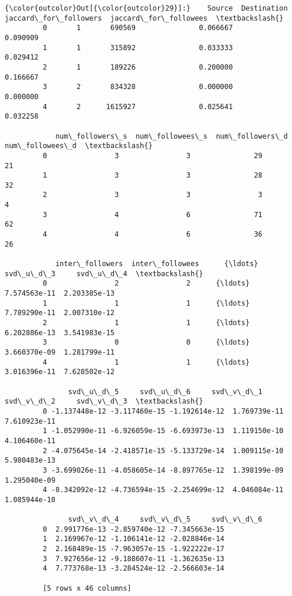 \documentclass[11pt]{article}
\begin{document}
\begin{Verbatim}[commandchars=\\\{\}]
{\color{outcolor}Out[{\color{outcolor}29}]:}    Source  Destination  jaccard\_for\_followers  jaccard\_for\_followees  \textbackslash{}
         0       1       690569               0.066667               0.090909   
         1       1       315892               0.033333               0.029412   
         2       1       189226               0.200000               0.166667   
         3       2       834328               0.000000               0.000000   
         4       2      1615927               0.025641               0.032258   
         
            num\_followers\_s  num\_followees\_s  num\_followers\_d  num\_followees\_d  \textbackslash{}
         0                3                3               29               21   
         1                3                3               28               32   
         2                3                3                3                4   
         3                4                6               71               62   
         4                4                6               36               26   
         
            inter\_followers  inter\_followees      {\ldots}          svd\_u\_d\_3     svd\_u\_d\_4  \textbackslash{}
         0                2                2      {\ldots}       7.574563e-11  2.203385e-13   
         1                1                1      {\ldots}       7.789290e-11  2.007310e-12   
         2                1                1      {\ldots}       6.202886e-13  3.541983e-15   
         3                0                0      {\ldots}       3.660370e-09  1.281799e-11   
         4                1                1      {\ldots}       3.016396e-11  7.628502e-12   
         
               svd\_u\_d\_5     svd\_u\_d\_6     svd\_v\_d\_1     svd\_v\_d\_2     svd\_v\_d\_3  \textbackslash{}
         0 -1.137448e-12 -3.117460e-15 -1.192614e-12  1.769739e-11  7.610923e-11   
         1 -1.052990e-11 -6.926059e-15 -6.693973e-13  1.119150e-10  4.106460e-11   
         2 -4.075645e-14 -2.418571e-15 -5.133729e-14  1.009115e-10  5.980483e-13   
         3 -3.699026e-11 -4.058605e-14 -8.897765e-12  1.398199e-09  1.295040e-09   
         4 -8.342092e-12 -4.736594e-15 -2.254699e-12  4.046084e-11  1.085944e-10   
         
               svd\_v\_d\_4     svd\_v\_d\_5     svd\_v\_d\_6  
         0  2.991776e-13 -2.859740e-12 -7.345663e-15  
         1  2.169967e-12 -1.106141e-12 -2.028846e-14  
         2  2.168489e-15 -7.963057e-15 -1.922222e-17  
         3  7.927656e-12 -9.188607e-11 -1.362635e-13  
         4  7.773768e-13 -3.284524e-12 -2.566603e-14  
         
         [5 rows x 46 columns]
\end{Verbatim}
            
\end{document}
